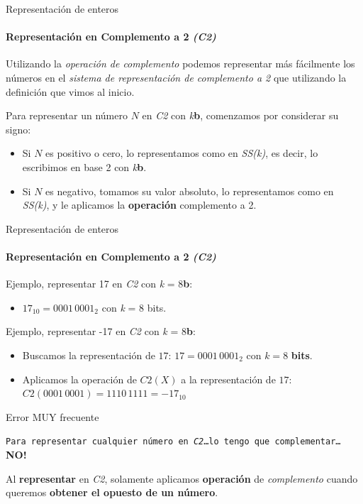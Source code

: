 \documentclass[11pt,a4paper,spanish]{beamer}
\newcommand{\bit}{\textbf{b}}
\begin{document}
\begin{frame}{Representación de enteros}
    \framesubtitle{Representación en Complemento a 2 \emph{(C2)}}

    Utilizando la \emph{operación de complemento} podemos representar más
    fácilmente los números en el \emph{sistema de representación de
    complemento a 2} que utilizando la definición que vimos al inicio.

    Para representar un número \(N\) en \emph{C2} con \emph{k}\bit{},\pause{}
    comenzamos por considerar su signo:

    \begin{itemize}
    \pause
    \item Si \(N\) es positivo o cero, lo representamos como en \emph{SS(k)},
        es decir, lo escribimos en base 2 con \emph{k}\bit{}.
    \item Si \(N\) es negativo, tomamos su valor absoluto, lo representamos
        como en \emph{SS(k)}, y le aplicamos la \textbf{operación} complemento
            a 2.
\end{itemize}
\end{frame}

\begin{frame}{Representación de enteros}
    \framesubtitle{Representación en Complemento a 2 \emph{(C2)}}

    Ejemplo, representar 17 en \emph{C2} con \emph{k} = 8\bit{}:
    \pause
    \begin{itemize}
        \item \(17_{10} = 0001\,0001_{2}\) con \emph{k} = 8 bits.
    \end{itemize}
    \pause

    Ejemplo, representar -17 en \emph{C2} con \emph{k} = 8\bit{}:
    \pause

    \begin{itemize}
        \item Buscamos la representación de \(17\): \(17 = 0001\,0001_{2}\)
            con \(k=8\) \textbf{bits}.\pause
        \item Aplicamos la operación de \(C2(X)\) a la representación de
            \(17\): \(C2(0001\,0001) = 1110\,1111 = -17_{10}\)
    \end{itemize}
\end{frame}


\begin{frame}{Error MUY frecuente}

    \texttt{Para representar cualquier número en \emph{C2}\ldots lo tengo que
    complementar\ldots} \textbf{NO!} \pause

    Al \textbf{representar} en \emph{C2}, solamente aplicamos
    \textbf{operación} de \emph{complemento} cuando queremos \textbf{obtener
    el opuesto de un número}.

\end{frame}
\end{document}
